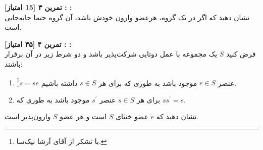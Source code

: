 \documentclass{article}
\newenvironment{exercise}[3][\unskip]{%
	\par
	\noindent
	\textbf{تمرین
		#1
		[#2 امتیاز] 
		\def\temp{#3}\ifx\temp\empty
		: 
		\else
		: #3 \vspace{0.5em} \\ \noindent
		\fi
}}{}
\begin{document}
\begin{exercise}[۳]{15}{}
	 نشان دهید که اگر در یک گروه، هرعضو وارون خودش باشد، آن گروه حتما جابه‌جایی است.
\end{exercise}




\vspace{2em}
\begin{exercise}[۴]{۳۵}{}
	فرض کنید 
	$S$
	یک مجموعه با عمل دوتایی شرکت‌پذیر باشد و دو شرط زیر در آن برقرار باشند:
	\begin{enumerate}
		\item عنصر 
		$e\in S$ 
		موجود باشد به طوری که برای هر 
		$s \in S$
		داشته باشیم 
		$s = se$\footnote{با تشکر از آقای آرشا نیک‌سا.}.
		\item برای هر 
		$s\in S$
		عنصر 
		$ s^{'}$
		موجود باشد به طوری که 
		$s s^{'} = e$.
	\end{enumerate}
	نشان دهید که 
	$e$
	عضو خنثای 
	$S$
	است و هر عضو 
	$S$
	وارون‌پذیر است.
\end{exercise}
\end{document}
